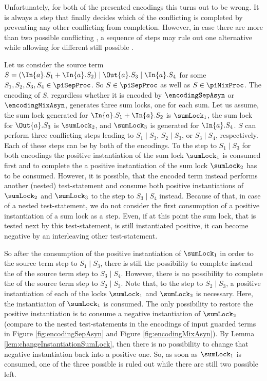 \documentclass[]{llncs}
\begin{document}
Unfortunately, for both of the presented encodings this turns out to be wrong. It is always a \nonAdmin step that finally decides which of the conflicting \simulations is completed by preventing any other conflicting \simulation from completion. However, in case there are more than two possible conflicting \simulations, a sequence of \admin steps may rule out one alternative while allowing for different still possible \simulations.

\begin{example} \label{exa:intermediateStates}
	Let us consider the source term $ S = \left( \In{a}.S_1 + \In{a}.S_2 \right) \mid \Out{a}.S_3 \mid \In{a}.S_4 $ for some $ S_1, S_2, S_3, S_4 \in \piSepProc $. So $ S \in \piSepProc $ as well as $ S \in \piMixProc $. The encoding of $ S $, regardless whether it is encoded by $ \encodingSepAsyn $ or $ \encodingMixAsyn $, generates three sum locks, one for each sum. Let us assume, the sum lock generated for $ \In{a}.S_1 + \In{a}.S_2 $ is $ \sumLock_1 $, the sum lock for $ \Out{a}.S_3 $ is $ \sumLock_2 $, and $ \sumLock_3 $ is generated for $ \In{a}.S_4 $. $ S $ can perform three conflicting steps leading to $ S_1 \mid S_3 $, $ S_2 \mid S_3 $, or $ S_3 \mid S_4 $, respectively. Each of these steps can be \simulated by both of the encodings. To \simulate the step to $ S_1 \mid S_3 $ for both encodings the positive instantiation of the sum lock $ \sumLock_1 $ is consumed first and to complete the \simulation a positive instantiation of the sum lock $ \sumLock_2 $ has to be consumed. However, it is possible, that the encoded term instead performs another (nested) test-statement and consume both positive instantiations of $ \sumLock_2 $ and $ \sumLock_3 $ to \simulate the step to $ S_3 \mid S_4 $ instead. Because of that, in case of a nested test-statement, we do not consider the first consumption of a positive instantiation of a sum lock as a \nonAdmin step. Even, if at this point the sum lock, that is tested next by this test-statement, is still instantiated positive, it can become negative by an interleaving other test-statement.
	
	So after the consumption of the positive instantiation of $ \sumLock_1 $ in order to \simulate the source term step to $ S_1 \mid S_3 $, there is still the possibility to complete instead the \simulation of the source term step to $ S_3 \mid S_4 $. However, there is no possibility to complete the \simulation of the source term step to $ S_2 \mid S_3 $. Note that, to \simulate the step to $ S_2 \mid S_3 $, a positive instantiation of each of the locks $ \sumLock_1 $ and $ \sumLock_2 $ is necessary. Here, the instantiation of $ \sumLock_1 $ is consumed. The only possibility to restore the positive instantiation is to consume a negative instantiation of $ \sumLock_2 $ (compare to the nested test-statements in the encodings of input guarded terms in Figure \ref{fig:encodingSepAsyn} and Figure \ref{fig:encodingMixAsyn}). By Lemma \ref{lem:changeInstantiationSumLock}, then there is no possibility to change that negative instantiation back into a positive one. So, as soon as $ \sumLock_1 $ is consumed, one of the three possible \simulations is ruled out while there are still two possible \simulations left.
\end{example}
\end{document}
